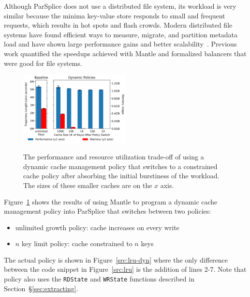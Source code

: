 Although ParSplice does not use a distributed file system, its workload is very
similar because the minima key-value store responds to small and frequent
requests, which results in hot spots and flash crowds.  Modern distributed file
systems have found efficient ways to measure, migrate, and partition metadata
load and have shown large performance gains and
better scalability~\cite{zheng:pdsw2014-batchfs, zheng:pdsw2015-deltafs,
grider:pdsw2015-marfs, ren:sc2014-indexfs, patil:fast2011-giga+,
brandt:msst2003-lh}.  Previous work quantified the speedups achieved with
Mantle and formalized balancers that were good for file systems.

\begin{figure}[t]
  \noindent\includegraphics[width=0.5\textwidth]{figures/methodology-tradeoff-dynamic.png}\\
  \caption{The performance and resource utilization trade-off of using a
  dynamic cache management policy that switches to a constrained cache policy after absorbing
  the initial burstiness of the workload. The sizes of these smaller caches are
  on the \(x\) axis.  \label{fig:methodology-tradeoff-dynamic}}
\end{figure}

Figure~\ref{fig:methodology-tradeoff-dynamic} shows the results of using Mantle
to program a dynamic cache management policy into ParSplice that switches between
two policies:

\begin{itemize}
  \item unlimited growth policy: cache increases on every write
  \item \(n\) key limit policy: cache constrained to \(n\) keys
\end{itemize}

The actual policy is shown in Figure~\ref{src:lru-dyn} where the only
difference between the code snippet in Figure~\ref{src:lru} is the addition of
lines 2-7. Note that policy also uses the \texttt{RDState} and \texttt{WRState}
functions described in Section~\S\ref{sec:extracting}.

